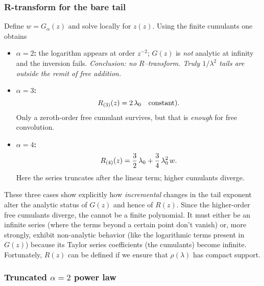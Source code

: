 \subsubsection{R-transform for the bare tail}
\label{sxn:RTransformExists:Rbare}

Define $w=G_{\alpha}(z)$ and solve locally for $z(z)$.  
Using the finite cumulants one obtains

\begin{itemize}
\item \textbf{$\alpha=2$:}  
  the logarithm appears at order $z^{-2}$; $G(z)$ is \emph{not} analytic at
  infinity and the inversion fails.  
  \emph{Conclusion: no $R$–transform.  Truly $1/\lambda^{2}$ tails are
  outside the remit of free addition.}

\item \textbf{$\alpha=3$:}
  \begin{equation}
  \label{eqn:RTransformExists_R3_final}
  R_{(3)}(z)=2\,\lambda_{0}
  \quad\text{constant}).
  \end{equation}
  Only a zeroth-order free cumulant survives, but that is \emph{enough}
  for free convolution.

\item \textbf{$\alpha=4$:}
  \begin{equation}
  \label{eqn:RTransformExists_R4_final}
  R_{(4)}(z)=\frac{3}{2}\,\lambda_{0}+
             \frac{3}{4}\,\lambda_{0}^{2}\,w.
  \end{equation}
  Here the series truncates after the linear term; higher cumulants
  diverge.
\end{itemize}

These three cases show explicitly how \emph{incremental} changes in the
tail exponent alter the analytic status of $G(z)$ and hence of $R(z)$. Since the  higher-order free cumulants diverge, the \RTransform cannot be a finite polynomial. It must either be an infinite series (where the terms beyond a certain point don't vanish) or, more strongly, exhibit non-analytic behavior (like the logarithmic terms present in $G(z)$) because its Taylor series coefficients (the cumulants) become infinite. Fortunately, $R(z)$ can be defined if we ensure that $\rho(\lambda)$ has compact support.
\subsubsection{Truncated \texorpdfstring{$\alpha=2$}{alpha=2} power law}
\label{sxn:RTransformExists:trunc2}

